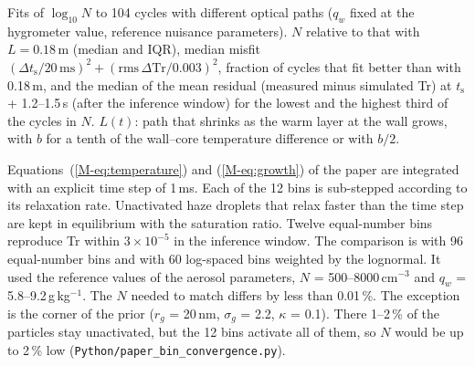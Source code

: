 \documentclass[12pt]{article}
\begin{document}
\begin{table}[!htbp]
\centering
\caption{Fits of $\log_{10}N$ to 104 cycles with different optical paths ($q_w$ fixed at the
hygrometer value, reference nuisance parameters). $N$ relative to that with
$L = 0.18$\,m (median and IQR), median misfit $(\Delta t_\mathrm{s}/20\,\mathrm{ms})^2 +
(\mathrm{rms}\,\Delta\mathrm{Tr}/0.003)^2$, fraction of cycles that fit better than with 0.18\,m, and the
median of the mean residual (measured minus simulated Tr) at $t_\mathrm{s}$ + 1.2--1.5\,s (after the inference
window) for the lowest and the highest third of the cycles in $N$. $L(t)$: path that shrinks as the
warm layer at the wall grows, with $b$ for a tenth of the wall--core temperature difference or with
$b/2$.}
\label{tab:s_path}
\begin{adjustbox}{max width=\textwidth}\small\end{adjustbox}
\end{table}

Equations~(\ref{M-eq:temperature}) and (\ref{M-eq:growth}) of the paper are integrated with an explicit
time step of 1\,ms. Each of the 12 bins is sub-stepped according to its relaxation rate. Unactivated haze
droplets that relax faster than the time step are kept in equilibrium with the
saturation ratio.
Twelve equal-number bins reproduce Tr within $3\times10^{-5}$ in the inference window. The comparison is
with 96 equal-number bins and with 60 log-spaced bins weighted by the lognormal. It used the reference
values of the aerosol parameters, $N$ = 500--8000\,cm$^{-3}$ and $q_w$ = 5.8--9.2\,g\,kg$^{-1}$. The $N$
needed to match differs by
less than 0.01\,\%. The exception is the corner of the prior ($r_g$ = 20\,nm, $\sigma_g$ = 2.2, $\kappa$ =
0.1). There 1--2\,\% of the particles stay unactivated, but the 12 bins activate all of them, so $N$ would
be up to 2\,\% low (\texttt{Python/\allowbreak paper\_bin\_convergence.py}).
\end{document}
